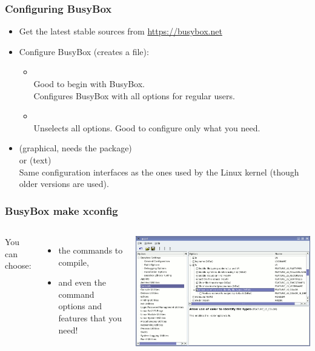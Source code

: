 \begin{frame}
  \frametitle{Configuring BusyBox}
  \begin{itemize}
  \item Get the latest stable sources from \url{https://busybox.net}
  \item Configure BusyBox (creates a  file):
    \begin{itemize}
    \item {}\\
      Good to begin with BusyBox.\\
      Configures BusyBox with all options for regular users.
    \item {}\\
      Unselects all options. Good to configure only what you need.
    \end{itemize}
  \item {} (graphical, needs the  package)\\
    or  (text)\\
    Same configuration interfaces as the ones used by the Linux kernel
    (though older versions are used).
  \end{itemize}
\end{frame}

\begin{frame}
  \frametitle{BusyBox make xconfig}
  \begin{columns}
    You can choose:
    \begin{itemize}
    \item the commands to compile,
    \item and even the command options and features that you need!
    \end{itemize}
    \includegraphics[width=\textwidth]{slides/sysdev-busybox/xconfig-screenshot.png}
  \end{columns}
\end{frame}

